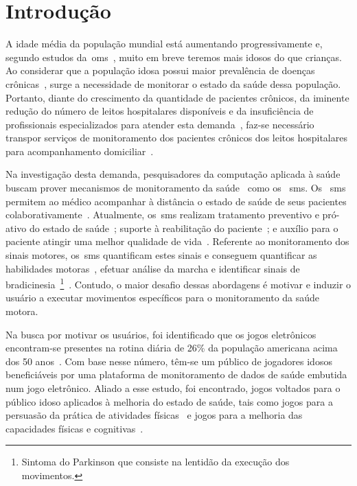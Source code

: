 \chapter{Introdu\c{c}\~{a}o} \label{chapter:intro}

A idade média da população mundial está aumentando progressivamente e, segundo estudos da~\ac{oms}~\cite{ageing2011}, muito em breve teremos mais idosos do que crianças. Ao considerar que a população idosa possui maior prevalência de doenças crônicas~\cite{prevcronica2009}, surge a necessidade de monitorar o estado da saúde dessa população. Portanto, diante do crescimento da quantidade de pacientes crônicos, da iminente redução do número de leitos hospitalares disponíveis e da insuficiência de profissionais especializados para atender esta demanda~\cite{healthmonitoring2013}, faz-se necessário transpor serviços de monitoramento dos pacientes crônicos dos leitos hospitalares para acompanhamento domiciliar~\cite{homecarebrazil2011}. 

Na investigação desta demanda, pesquisadores da computação aplicada à saúde buscam prover mecanismos de monitoramento da saúde~\cite{healthmonitoring2013,bardram2010,aarhus_negotiating_2010} como os ~\ac{sms}. Os ~\ac{sms} permitem ao médico acompanhar à distância o estado de saúde de seus pacientes colaborativamente~\cite{healthmonitoring2013}. Atualmente, os~\ac{sms} realizam tratamento preventivo e pró-ativo do estado de saúde~\cite{bardram2010}; suporte à reabilitação do paciente~\cite{sacbespoke2014}; e auxílio para o paciente atingir uma melhor qualidade de vida~\cite{sacsvmhms2014}. Referente ao monitoramento dos sinais motores, os~\ac{sms} quantificam estes sinais e conseguem quantificar as habilidades motoras~\cite{manumeterjbhi2014,patel_monitoring_2009}, efetuar análise da marcha \cite{robotgait2014} e identificar sinais de bradicinesia~\footnote{Sintoma do Parkinson que consiste na lentidão da execução dos movimentos.}~\cite{ambulatoryparkinson2010}. Contudo, o maior desafio dessas abordagens é motivar e induzir o usuário a executar movimentos específicos para o monitoramento da saúde motora.

Na busca por motivar os usuários, foi identificado que os jogos eletrônicos encontram-se presentes na rotina diária de 26\% da população americana acima dos 50 anos~\cite{esa2016}. Com base nesse número, têm-se um público de jogadores idosos beneficiáveis por uma plataforma de monitoramento de dados de saúde embutida num jogo eletrônico. Aliado a esse estudo, foi encontrado, jogos voltados para o público idoso aplicados à melhoria do estado de saúde, tais como jogos para a persuasão da prática de atividades físicas~\cite{brox11} e jogos para a melhoria das capacidades físicas e cognitivas~\cite{arntzen2011}. 


